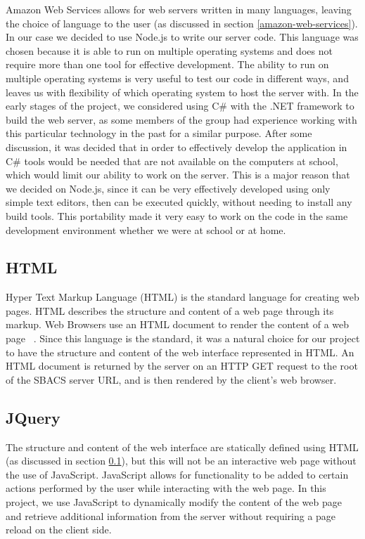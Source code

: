 \documentclass[12pt]{report}
\let\Oldsubsection\subsection
\renewcommand{\subsection}{\FloatBarrier\Oldsubsection}
\begin{document}
Amazon Web Services allows for web
servers written in many languages, leaving the choice of language to the user (as discussed in section \ref{amazon-web-services}).
In our case we
decided to use Node.js to write our server code. This language was chosen because it is able to
run on multiple operating systems and does not require more than one tool for effective development.
The ability to run on multiple operating systems is very useful to test our code in different ways,
and leaves us with flexibility of which operating system to host the server with. In the early
stages of the project, we considered using C\# with the .NET framework to build the web server,
as some members of the group had experience working with this particular technology in the past
for a similar purpose. After some discussion, it was decided that in order to effectively develop
the application in C\# tools would be needed that are not available on the computers at school,
which would limit our ability to work on the server. This is a major reason that we decided on
Node.js, since it can be very effectively developed using only simple text editors, then can be
executed quickly, without needing to install any build tools. This portability made it very easy to
work on the code in the same development environment whether we were at school or at home.

\subsection{HTML} \label{html}

Hyper Text Markup Language (HTML) is the standard language for creating web pages. HTML describes the
structure and content of a web page through its markup. Web Browsers use an HTML document to render
the content of a web page ~\autocite{HTMLREF}. Since this language is the standard, it was a natural choice for our
project to have the structure and content of the web interface represented in HTML. An HTML document
is returned by the server on an HTTP GET request to the root of the SBACS server URL, and is then
rendered by the client's web browser.

\subsection{JQuery} \label{jquery}

The structure and content of the web interface are statically defined using HTML (as discussed in section \ref{html}), but this will not
be an interactive web page without the use of JavaScript. JavaScript allows for functionality to be
added to certain actions performed by the user while interacting with the web page. In this project,
we use JavaScript to dynamically modify the content of the web page and retrieve additional
information from the server without requiring a page reload on the client side.
\end{document}
